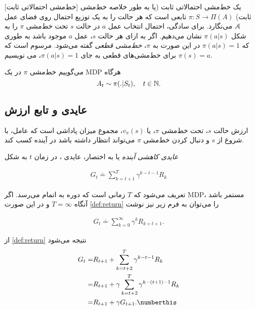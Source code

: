 [خط‌مشی احتمالاتی ثابت]
یک خط‌مشی احتمالاتی ثابت (یا به طور خلاصه خط‌مشی ثابت) 
$\pi: S \to \Pi(A)$
تابعی است که هر حالت را به یک توزیع احتمال روی فضای عمل
$\EuScript{A}$
 می‌نگارد.
برای سادگی، احتمال انتخاب عمل $a$ در حالت $s$ تحت خط‌مشی $\pi$ را به شکل
$\pi(a|s)$
نشان می‌دهیم.
اگر به ازای هر حالت $s$، عمل $a$ موجود باشد به طوری که 
$\pi(a|s) = 1$
در این صورت به $\pi$،
\textit{
	خط‌مشی قطعی
}
گفته می‌شود. مرسوم است که برای خط‌مشی‌های قطعی به جای 
$\pi(a|s) = 1$،
می نویسیم
$\pi(s) = a$.


می‌گوییم خط‌مشی $\pi$ در یک
 MDP
  \textit{
  }
   هرگاه
$$A_t \sim \pi(. |S_t),	 \quad t \in \mathbb{N}.$$




\subsection{عایدی و تابع ارزش}

ارزش حالت $s$، تحت خط‌مشی $\pi$، یا
 $v_\pi(s)$،
مجموع میزان پاداشی است که عامل، با شروع از $s$ و دنبال کردن خط‌مشی $\pi$ می‌تواند انتظار داشته باشد در آینده کسب کند.

\textit{عایدی کاهشی آینده}
 یا به اختصار، عایدی ، در زمان $t$ به شکل

\begin{align}
G_t \doteq \sum_{k=t+1}^{T} \gamma^{k-t-1} R_{k}
\label{def:return}
\end{align}

تعریف می‌شود که $T$ زمانی است که دوره به اتمام می‌رسد. اگر MDP، مستمر باشد آنگاه 
$T=\infty$ و
در این صورت 
\ref{def:return}
 را می‌توان به فرم زیر نیز نوشت
 
\begin{align}
	G_t \doteq \sum_{k=0}^{\infty} \gamma^{k} R_{k+t+1}.
	\label{def:returninf}
\end{align}
 

از
 \ref{def:return}
  نتیجه می‌شود \cite{suttonbook}
\begin{align}
G_t =& R_{t+1} + \sum_{k=t+2}^{T} \gamma^{k-t-1} R_{k} \nonumber \\
=& R_{t+1} + \gamma \sum_{k=t+2}^{T} \gamma^{k - (t+1) - 1} R_{k} \nonumber \\
=& R_{t+1} + \gamma G_{t+1}. \numberthis
\label{eq:returnres}
\end{align}

